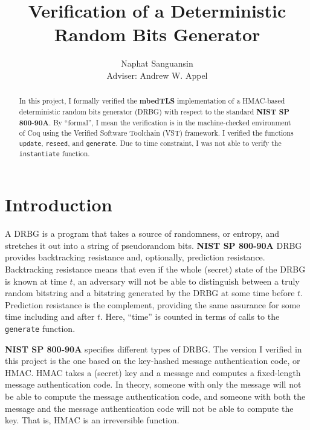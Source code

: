 \documentclass[pageno]{jpaper}
\newcommand{\stdtitle}[1]{\textbf{#1}}
\begin{document}
\title{
Verification of a Deterministic Random Bits Generator
}

\author{Naphat Sanguansin\\Adviser: Andrew W. Appel}

\date{}
\maketitle

\thispagestyle{empty}
\doublespacing
\begin{abstract}
In this project, I formally verified the \stdtitle{mbedTLS} implementation of a HMAC-based deterministic random bits generator (DRBG) with respect to the standard \stdtitle{NIST SP 800-90A}. By “formal”, I mean the verification is in the machine-checked environment of Coq using the Verified Software Toolchain (VST) framework. I verified the functions \lstinline{update}, \lstinline{reseed}, and \lstinline{generate}. Due to time constraint, I was not able to verify the \lstinline{instantiate} function.
\end{abstract}

\section{Introduction}
A DRBG is a program that takes a source of randomness, or entropy, and stretches it out into a string of pseudorandom bits. \stdtitle{NIST SP 800-90A} \cite{nist} DRBG provides backtracking resistance and, optionally, prediction resistance. Backtracking resistance means that even if the whole (secret) state of the DRBG is known at time $t$, an adversary will not be able to distinguish between a truly random bitstring and a bitstring generated by the DRBG at some time before $t$. Prediction resistance is the complement, providing the same assurance for some time including and after $t$. Here, “time” is counted in terms of calls to the \lstinline{generate} function.

\stdtitle{NIST SP 800-90A} specifies different types of DRBG. The version I verified in this project is the one based on the key-hashed message authentication code, or HMAC. HMAC takes a (secret) key and a message and computes a fixed-length message authentication code. In theory, someone with only the message will not be able to compute the message authentication code, and someone with both the message and the message authentication code will not be able to compute the key. That is, HMAC is an irreversible function.
\end{document}
